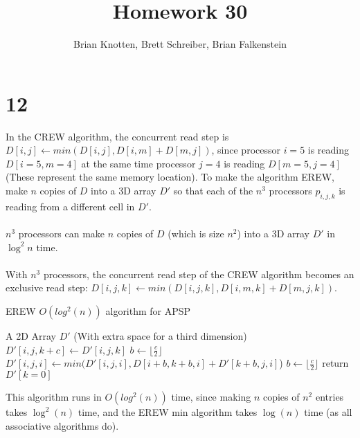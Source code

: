 \documentclass[letterpaper,notitlepage,twoside]{article}
\begin{document}
\title{Homework 30}
\author{Brian Knotten, Brett Schreiber, Brian Falkenstein}
\maketitle

\section*{12}
In the CREW algorithm, the concurrent read step is $D[i,j] \gets min(D[i, j], D[i, m] + D[m, j])$, since processor $i = 5$ is reading $D[i = 5, m = 4]$ at the same time processor $j = 4$ is reading $D[m = 5, j = 4]$ (These represent the same memory location). To make the algorithm EREW, make $n$ copies of $D$ into a 3D array $D'$ so that each of the $n^3$ processors $p_{i, j, k}$ is reading from a different cell in $D'$.
\\\\
$n^3$ processors can make $n$ copies of $D$ (which is size $n^2$) into a 3D array $D'$ in $\log^2 n$ time.
\\\\
With $n^3$ processors, the concurrent read step of the CREW algorithm becomes an exclusive read step: $D[i, j, k] \gets min(D[i, j, k], D[i, m, k] + D[m, j, k])$.
\begin{algorithm}[H]
  \begin{algorithmic}%
    \caption{EREW $O(log^{2} (n))$ algorithm for APSP}
    \Require A 2D Array $D'$ (With extra space for a third dimension)
    		\State $D'[i, j, k+c] \gets D'[i, j, k]$ 
    	\EndIf
    \EndWhile
    \State $b \gets \lfloor{\frac{c}{2}}\rfloor$
        	\State $D'[i, j, i] \gets min(D'[i, j, i], D[i+b, k+b, i] + D'[k+b, j, i]$) 
            \State $b \gets \lfloor{\frac{c}{2}}\rfloor$ 
    \EndWhile
		\State return $D'[k = 0]$ 
	\EndIf
  \end{algorithmic}
\end{algorithm}

This algorithm runs in $O(log^2(n))$ time, since making $n$ copies of $n^2$ entries takes $\log^2(n)$ time, and the EREW min algorithm takes $\log(n)$ time (as all associative algorithms do).
\end{document}
